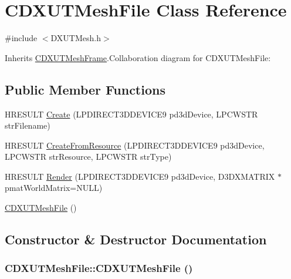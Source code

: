 \hypertarget{class_c_d_x_u_t_mesh_file}{
\section{CDXUTMeshFile Class Reference}
\label{class_c_d_x_u_t_mesh_file}
}


{\ttfamily \#include $<$DXUTMesh.h$>$}

Inherits \hyperlink{class_c_d_x_u_t_mesh_frame}{CDXUTMeshFrame}.Collaboration diagram for CDXUTMeshFile:\subsection*{Public Member Functions}
\begin{DoxyCompactItemize}
\item 
HRESULT \hyperlink{class_c_d_x_u_t_mesh_file_abdbbccbd662dde43e4b8901d81ee763a}{Create} (LPDIRECT3DDEVICE9 pd3dDevice, LPCWSTR strFilename)
\item 
HRESULT \hyperlink{class_c_d_x_u_t_mesh_file_aaddc2094bb8721b5310b4a14f884a1e2}{CreateFromResource} (LPDIRECT3DDEVICE9 pd3dDevice, LPCWSTR strResource, LPCWSTR strType)
\item 
HRESULT \hyperlink{class_c_d_x_u_t_mesh_file_afaab9ad6b0aa2c93dce458fd5866571f}{Render} (LPDIRECT3DDEVICE9 pd3dDevice, D3DXMATRIX $\ast$pmatWorldMatrix=NULL)
\item 
\hyperlink{class_c_d_x_u_t_mesh_file_a3937c391d4e35a0847dd6d87d82ed683}{CDXUTMeshFile} ()
\end{DoxyCompactItemize}


\subsection{Constructor \& Destructor Documentation}
\hypertarget{class_c_d_x_u_t_mesh_file_a3937c391d4e35a0847dd6d87d82ed683}{
\subsubsection[{CDXUTMeshFile}]{\setlength{\rightskip}{0pt plus 5cm}CDXUTMeshFile::CDXUTMeshFile ()}}
\label{class_c_d_x_u_t_mesh_file_a3937c391d4e35a0847dd6d87d82ed683}


